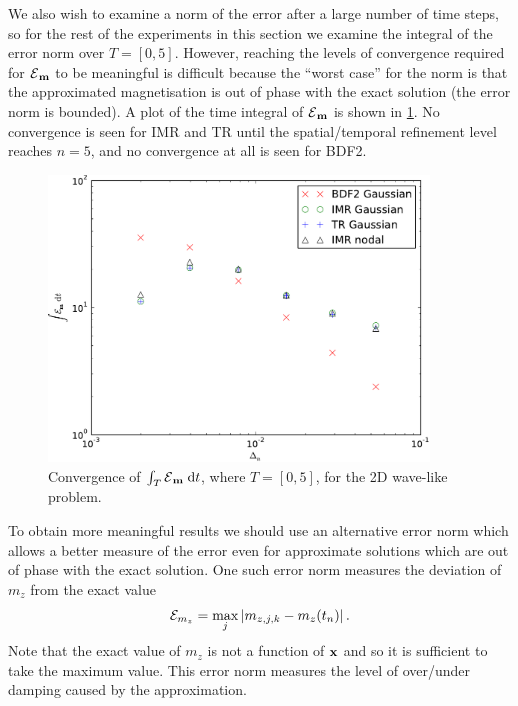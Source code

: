 We also wish to examine a norm of the error after a large number of time steps, so for the rest of the experiments in this section we examine the integral of the error norm over $T = [0, 5]$.
However, reaching the levels of convergence required for $\mathcal{E}{}_{\boldsymbol{\mathrm{m}}}$ to be meaningful is difficult because the ``worst case'' for the norm is that the approximated magnetisation is out of phase with the exact solution (\ie the error norm is bounded).
A plot of the time integral of $\mathcal{E}{}_{\boldsymbol{\mathrm{m}}}$ is shown in \cref{fig:convergence-long-time-full-norm}.
No convergence is seen for IMR and TR until the spatial/temporal refinement level reaches $n=5$, and no convergence at all is seen for BDF2.
\begin{figure}
  \centering
  \includegraphics[width=0.9\textwidth]{plots/2d_wave_solution_convergence_long_time/errornormintegralvsfakemeanofdts.pdf}
  \caption{Convergence of ${\int_T {\mathcal{E}{}_{\boldsymbol{\mathrm{m}}}} {\; \mathrm{{d}}} t}$, where $T=[0,5]$, for the 2D wave-like problem.
  }
  \label{fig:convergence-long-time-full-norm}
\end{figure}

To obtain more meaningful results we should use an alternative error norm which allows a better measure of the error even for approximate solutions which are out of phase with the exact solution.
One such error norm measures the deviation of $m_z$ from the exact value
\begin{equation}
  \mathcal{E}_{m_z} = \max_j \left|{m_{z,j,k} - m_z(t_n)} \right|.
\end{equation}
Note that the exact value of $m_z$ is not a function of $\boldsymbol{\mathrm{x}}$ and so it is sufficient to take the maximum value.
This error norm measures the level of over/under damping caused by the approximation.

